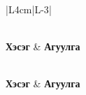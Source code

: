 \begin{longtable}{|L{4cm}|L{\dimexpr\textwidth-4cm-3\arrayrulewidth\relax}|}
\caption{Ажлын явц: Банкны хуулга оруулах (UC-FS-01)}\label{tab:ucfs01}\\ \hline
\textbf{Хэсэг} & \textbf{Агуулга} \\ \hline
\endfirsthead

 \\ \hline
\textbf{Хэсэг} & \textbf{Агуулга} \\ \hline
\endhead

\hline {} \\ \hline
\endfoot

\hline
\endlastfoot


\end{longtable}
